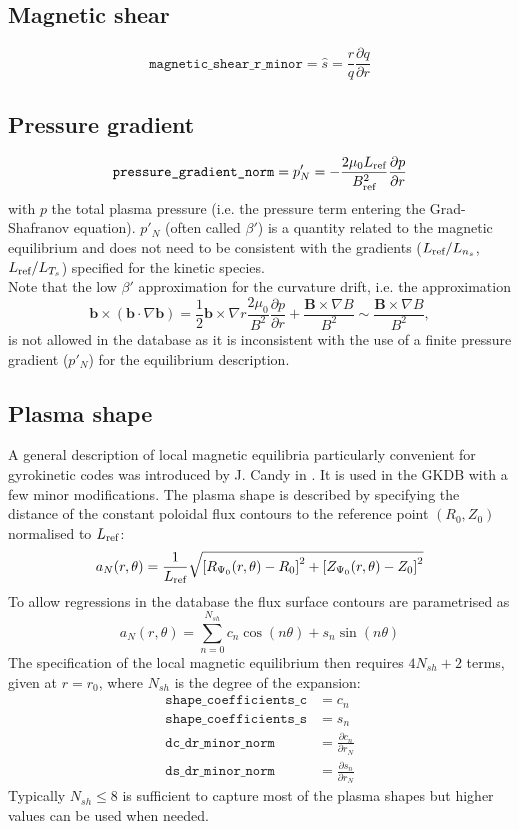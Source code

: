 \documentclass[a4paper]{report}
\begin{document}
\subsection{Magnetic shear} \label{sec:shat}
$$\texttt{magnetic\_shear\_r\_minor}=\hat{s}=\frac{r}{q}\frac{\partial q}{\partial r}$$


\subsection{Pressure gradient} \label{sec:pressure:gradient}
$$\texttt{pressure\_gradient\_norm}=p'_N = -\frac{2\mu_0 L_{\textrm{ref}}}{B_{\textrm{ref}}^2 }\frac{\partial p}{\partial r}$$
with $p$ the total plasma pressure (i.e. the pressure term entering the Grad-Shafranov equation). $p'_N$ (often called $\beta'$) is a quantity related to the magnetic equilibrium and does not need to be consistent with the gradients ($L_{\textrm{ref}}/L_{n_s}$, $L_{\textrm{ref}}/L_{T_s}$) specified for the kinetic species.\\
Note that the low $\beta'$ approximation for the curvature drift, i.e. the approximation
$$\mathbf{b}\times(\mathbf{b}\cdot\nabla\mathbf{b})=\frac{1}{2}\mathbf{b}\times\nabla r\frac{2\mu_0}{B^2}\frac{\partial p}{\partial r} + \frac{\mathbf{B}\times\nabla B}{B^2} \sim  \frac{\mathbf{B}\times\nabla B}{B^2}, $$
is not allowed in the database as it is inconsistent with the use of a finite pressure gradient ($p'_N$) for the equilibrium description. 


\subsection{Plasma shape} \label{sec:shape:coefficients}
A general description of local magnetic equilibria particularly convenient for gyrokinetic codes was introduced by J. Candy in \cite {Candy:PPCF2009}. It is used in the GKDB with a few minor modifications.
The plasma shape is described by specifying the distance of the constant poloidal flux contours to the reference point $(R_0,Z_0)$  normalised to $L_{\textrm{ref}}$:
$$ a_N(r,\theta) = \frac{1}{L_{\textrm{ref}}}\sqrt{\left[R_{\Psi_0}(r,\theta)-R_0\right]^2 + \left[Z_{\Psi_0}(r,\theta)-Z_0\right]^2} $$
To allow regressions in the database the flux surface contours are parametrised as 
$$ a_N(r,\theta) = \sum_{n=0}^{N_{sh}} c_n \cos(n\theta) + s_n \sin(n\theta) $$
The specification of the local magnetic equilibrium then requires $4N_{sh}+2$ terms, given at $r=r_0$, where $N_{sh}$ is the degree of the expansion: 
\begin{align*}
\texttt{shape\_coefficients\_c} & = c_n \\
\texttt{shape\_coefficients\_s} & = s_n \\
\texttt{dc\_dr\_minor\_norm} & = \frac{\partial c_n}{\partial r_N} \\
\texttt{ds\_dr\_minor\_norm} & = \frac{\partial s_n}{\partial r_N} 
\end{align*}
Typically $N_{sh}\leq8$ is sufficient to capture most of the plasma shapes but higher values can be used when needed.
\end{document}
